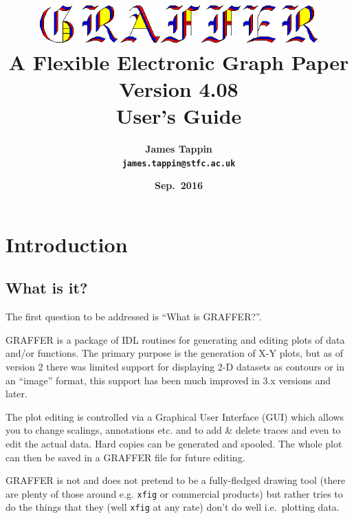 \documentclass[11pt,twoside,english]{article}
\begin{document}
\title{\includegraphics[width=0.80\textwidth]{logo} \\
  A Flexible Electronic Graph Paper\\
  Version 4.08\\
  User's Guide}

\author{\textsf{\textbf{\Large James Tappin}}\\
  \texttt{\textbf{\Large james.tappin@stfc.ac.uk}}}

\date{\textsf{\textbf{\large Sep.\ 2016}}}

\maketitle

\begin{multicols}{2}
  \tableofcontents{}
\end{multicols}

\section{Introduction}


\subsection{What is it?}

The first question to be addressed is {}``What is GRAFFER?''.

GRAFFER is a package of IDL routines for generating and editing plots
of data and/or functions. The primary purpose is the generation of X-Y
plots, but as of version 2 there was limited support for displaying 2-D
datasets as contours or in an {}``image'' format, this support has been
much improved in 3.x versions and later.

The plot editing is controlled via a Graphical User Interface (GUI)
which allows you to change scalings, annotations etc. and to add \&
delete traces and even to edit the actual data. Hard copies can be
generated and spooled. The whole plot can then be saved in a GRAFFER
file for future editing.

GRAFFER is not and does not pretend to be a fully-fledged drawing tool
(there are plenty of those around e.g. \texttt{xfig} or commercial
products) but rather tries to do the things that they (well
\texttt{xfig} at any rate) don't do well i.e.\ plotting data.
\end{document}
